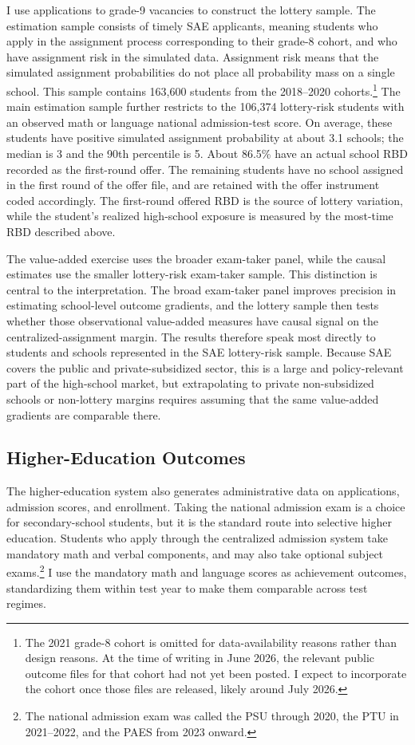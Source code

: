 \documentclass[a4paper, article, english, oneside, unknownkeysallowed, 12pt]{memoir}
\begin{document}
I use applications to grade-9 vacancies to construct the lottery sample.
The estimation sample consists of timely SAE applicants, meaning students who apply in the assignment process corresponding to their grade-8 cohort, and who have assignment risk in the simulated data.
Assignment risk means that the simulated assignment probabilities do not place all probability mass on a single school.
This sample contains 163,600 students from the 2018--2020 cohorts.\footnote{The 2021 grade-8 cohort is omitted for data-availability reasons rather than design reasons.
At the time of writing in June 2026, the relevant public outcome files for that cohort had not yet been posted.
I expect to incorporate the cohort once those files are released, likely around July 2026.}
The main estimation sample further restricts to the 106,374 lottery-risk students with an observed math or language national admission-test score.
On average, these students have positive simulated assignment probability at about 3.1 schools; the median is 3 and the 90th percentile is 5.
About 86.5\% have an actual school RBD recorded as the first-round offer.
The remaining students have no school assigned in the first round of the offer file, and are retained with the offer instrument coded accordingly.
The first-round offered RBD is the source of lottery variation, while the student's realized high-school exposure is measured by the most-time RBD described above.

The value-added exercise uses the broader exam-taker panel, while the causal estimates use the smaller lottery-risk exam-taker sample.
This distinction is central to the interpretation.
The broad exam-taker panel improves precision in estimating school-level outcome gradients, and the lottery sample then tests whether those observational value-added measures have causal signal on the centralized-assignment margin.
The results therefore speak most directly to students and schools represented in the SAE lottery-risk sample.
Because SAE covers the public and private-subsidized sector, this is a large and policy-relevant part of the high-school market, but extrapolating to private non-subsidized schools or non-lottery margins requires assuming that the same value-added gradients are comparable there.

\subsection{Higher-Education Outcomes}

The higher-education system also generates administrative data on applications, admission scores, and enrollment.
Taking the national admission exam is a choice for secondary-school students, but it is the standard route into selective higher education.
Students who apply through the centralized admission system take mandatory math and verbal components, and may also take optional subject exams.\footnote{The national admission exam was called the PSU through 2020, the PTU in 2021--2022, and the PAES from 2023 onward.}
I use the mandatory math and language scores as achievement outcomes, standardizing them within test year to make them comparable across test regimes.
\end{document}
